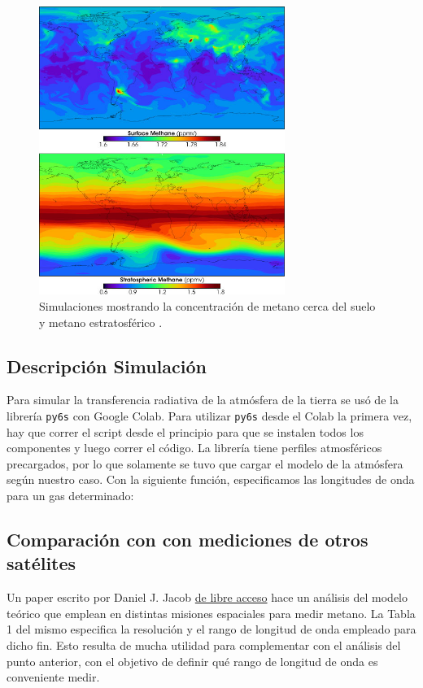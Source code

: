 \documentclass[11pt,titlepage]{article}
\begin{document}
\begin{figure}[htb!]
    \centering
    \includegraphics[width=8cm]{fig/AtmosphericMethane.png}
    \caption{Simulaciones mostrando la concentración de metano cerca del suelo y metano estratosférico \cite{hu2018global}.}
    \label{fig:atmosphericMethane}
\end{figure}

\subsection{Descripción Simulación}

Para simular la transferencia radiativa de la atmósfera de la tierra se usó de la librería \texttt{py6s} con Google Colab.
Para utilizar \texttt{py6s} desde el Colab la primera vez, hay que correr el script desde el principio para que se instalen todos los componentes y luego correr el código. La librería tiene perfiles atmosféricos precargados, por lo que solamente se tuvo que cargar el modelo de la atmósfera según nuestro caso.
Con la siguiente función, especificamos las longitudes de onda para un gas determinado:


% 

\subsection{Comparación con con mediciones de otros satélites}

Un paper escrito por Daniel J. Jacob \href{https://www.atmos-chem-phys.net/16/14371/2016/acp-16-14371-2016.pdf}{de libre acceso} \cite{jacob2016satellite} hace un análisis del modelo teórico que emplean en distintas misiones espaciales para medir metano. La Tabla 1 del mismo especifica la resolución y el rango de longitud de onda empleado para dicho fin. Esto resulta de mucha utilidad para complementar con el análisis del punto anterior, con el objetivo de definir qué rango de longitud de onda es conveniente medir.
\end{document}
